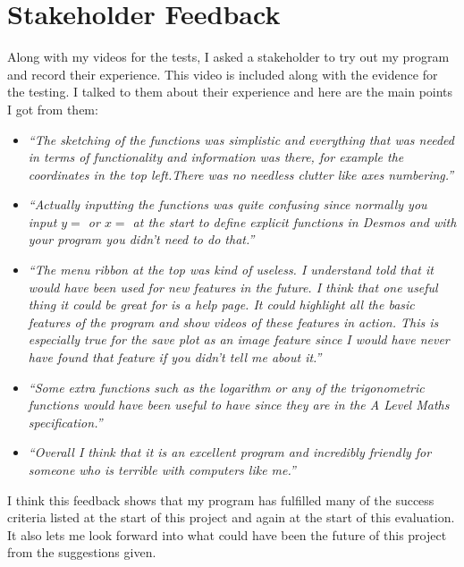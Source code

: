 \documentclass[../../../main.tex]{subfiles}
\begin{document}
\section{Stakeholder Feedback}%
Along with my videos for the tests, I asked a stakeholder to try out my program and record their experience. This video is included along with the evidence for the testing. I talked to them about their experience and here are the main points I got from them:
\begin{itemize}
	\item \textit{``The sketching of the functions was simplistic and everything that was needed in terms of functionality and information was there, for example the coordinates in the top left.There was no needless clutter like axes numbering.''}
	
	\item \textit{``Actually inputting the functions was quite confusing since normally you input $y=$ or $x=$ at the start to define explicit functions in Desmos and with your program you didn't need to do that.''}
	
	\item \textit{``The menu ribbon at the top was kind of useless. I understand told that it would have been used for new features in the future. I think that one useful thing it could be great for is a help page. It could highlight all the basic features of the program and show videos of these features in action. This is especially true for the save plot as an image feature since I would have never have found that feature if you didn't tell me about it.''}
	
	\item \textit{``Some extra functions such as the logarithm or any of the trigonometric functions would have been useful to have since they are in the A Level Maths specification.''}
	
	\item \textit{``Overall I think that it is an excellent program and incredibly friendly for someone who is terrible with computers like me.''}
\end{itemize}

I think this feedback shows that my program has fulfilled many of the success criteria listed at the start of this project and again at the start of this evaluation. It also lets me look forward into what could have been the future of this project from the suggestions given.
\end{document}
